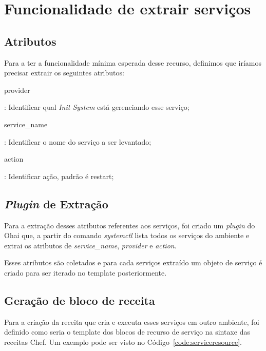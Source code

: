 \section{Funcionalidade de extrair serviços}
\label{sec:services}

\subsection{Atributos}

Para a ter a funcionalidade mínima esperada desse recurso, definimos que iríamos precisar
extrair os seguintes atributos:


\begin{itemize}
    {\itshape\item provider}: Identificar qual \textit{Init System} está gerenciando
esse serviço;
    {\itshape\item service\_name}: Identificar o nome do serviço a
ser levantado;
    {\itshape\item action}: Identificar ação, padrão é restart;
\end{itemize}

\subsection{\textit{Plugin} de Extração}
Para a extração desses atributos referentes aos serviços, foi criado um \textit{plugin} do
Ohai que, a partir do comando \textit{systemctl} lista todos os serviços do ambiente
e extrai os atributos de \textit{service\_name}, \textit{provider}
e \textit{action}.

Esses atributos são coletados e para cada serviços extraído um objeto de serviço
é criado para ser iterado no template posteriormente.

\subsection{Geração de bloco de receita}
Para a criação da receita que cria e executa esses serviços em outro ambiente, foi 
definido como seria o template dos blocos de recurso de serviço na sintaxe das 
receitas Chef. Um exemplo pode ser visto no Código~\ref{code:serviceresource}.

\noindent\begin{minipage}{\textwidth}
  \lstset{style=shell}
  
\end{minipage}\hfill

